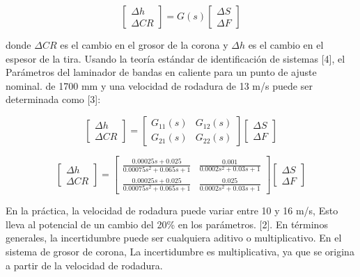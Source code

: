 \documentclass[journal,twoside,web]{ieeecolor}
\begin{document}
\begin{equation}
	\begin{bmatrix}
		 \Delta h  \\
		 \Delta CR 
	\end{bmatrix} = G(s) \begin{bmatrix}
							 \Delta S  \\
							 \Delta F 
	  					\end{bmatrix}
\end{equation}


donde $\Delta CR$ es el cambio en el grosor de la corona y $\Delta h$ es el cambio en el espesor de la tira. Usando la teoría estándar de identificación de sistemas [4], el Parámetros del laminador de bandas en caliente para un punto de ajuste nominal. de 1700 mm y una velocidad de rodadura de 13 m/s puede ser determinada como [3]:

\begin{equation}
	\begin{bmatrix}
		 \Delta h  \\
		 \Delta CR 
	\end{bmatrix} = \begin{bmatrix}
			G_{11}(s) & G_{12}(s) \\
			G_{21}(s) & G_{22}(s)
	\end{bmatrix} \begin{bmatrix}
							 \Delta S  \\
							 \Delta F 
						\end{bmatrix}
\end{equation}

	\begin{equation}
		\begin{bmatrix}
		\Delta h  \\
		\Delta CR 
		\end{bmatrix} = \begin{bmatrix}
							\frac{0.00025s + 0.025}{0.00075s^2 + 0.065s + 1} & 	\frac{0.001}{0.0002s^2 + 0.03s + 1} \\
							\frac{0.00025s + 0.025}{0.00075s^2 + 0.065s + 1} & \frac{0.025}{0.0002s^2 + 0.03s + 1}
						\end{bmatrix} \begin{bmatrix}
											\Delta S  \\
											\Delta F 
										\end{bmatrix}
	\end{equation}

En la práctica, la velocidad de rodadura puede variar entre 10 y 16 m/s, Esto lleva al potencial de un cambio del 20\% en los parámetros. [2]. En términos generales, la incertidumbre puede ser cualquiera aditivo o multiplicativo. En el sistema de grosor de corona, La incertidumbre es multiplicativa, ya que se origina a partir de la velocidad de rodadura.
\end{document}
